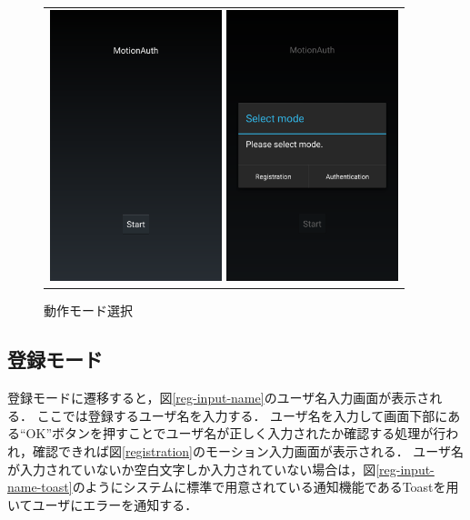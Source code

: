 \begin{figure}[bthp]
  \centering
  \begin{tabular}{c}
    \begin{minipage}{0.5\hsize}
      \centering
      \includegraphics[bb=0 0 1080 1705, width=5cm]{Screenshots/start.pdf}
      \caption{スタート画面}
      \label{start}
    \end{minipage}
    \begin{minipage}{0.5\hsize}
      \centering
      \includegraphics[bb=0 0 1080 1705, width=5cm]{Screenshots/select-mode.pdf}
      \caption{動作モード選択}
      \label{select-mode}
    \end{minipage}
  \end{tabular}
\end{figure}

\subsection{登録モード}
登録モードに遷移すると，図\ref{reg-input-name}のユーザ名入力画面が表示される．
ここでは登録するユーザ名を入力する．
ユーザ名を入力して画面下部にある``OK''ボタンを押すことでユーザ名が正しく入力されたか確認する処理が行われ，確認できれば図\ref{registration}のモーション入力画面が表示される．
ユーザ名が入力されていないか空白文字しか入力されていない場合は，図\ref{reg-input-name-toast}のようにシステムに標準で用意されている通知機能であるToastを用いてユーザにエラーを通知する．

